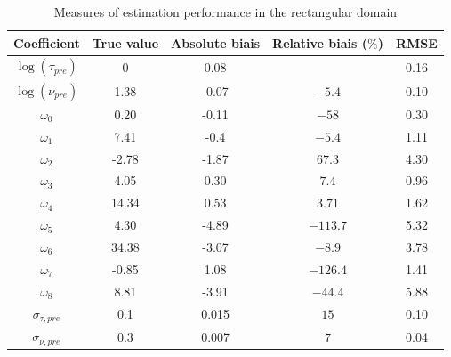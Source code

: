 \documentclass[11pt]{article}
\newcommand {\1}{\mathbb{1}}
\begin{document}
\begin{table}[H]
	\centering
	\begin{tabular}{|c|c|c|c|c|}
		\hline
		Coefficient  & True value & Absolute biais  & Relative biais ($\%$) & RMSE\\
		\hline
		$\log(\tau_{pre})$  & 0& 0.08 &  & 0.16\\
		
		$\log(\nu_{pre})$  & 1.38 & -0.07 & $-5.4 $ & 0.10 \\
		
		$\omega_0$  &  0.20  & -0.11 & $-58$ & 0.30 \\
		
		$\omega_1$  & 7.41 & -0.4 & $-5.4 $ & 1.11 \\
		
		$\omega_2$  & -2.78 & -1.87 &  $67.3$ & 4.30\\
		
		$\omega_3$  & 4.05 &  0.30 & $7.4$ & 0.96\\
		
		$\omega_4$  & 14.34 & 0.53 & $3.71$ &  1.62\\
		
		$\omega_5$  & 4.30 & -4.89 & $-113.7$ &  5.32\\
	
		$\omega_6$  &  34.38 & -3.07 & $-8.9$ &   3.78\\
		
		$\omega_7$  & -0.85 & 1.08 & $-126.4 $ & 1.41\\
	
		$\omega_8$  &  8.81 & -3.91 & $-44.4 $ & 5.88\\
		
		$\sigma_{\tau,pre}$ & 0.1 & 0.015& $15$ & 0.10\\
		
		$\sigma_{\nu,pre}$ & 0.3 & 0.007 & $7 $ & 0.04\\
		\hline
	\end{tabular}
	\caption{Measures of estimation performance in the rectangular domain}
	\label{table: estimation performance rect}
\end{table}
\end{document}
